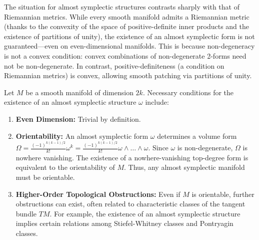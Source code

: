 The situation for almost symplectic structures contrasts sharply with that of Riemannian metrics. While every smooth manifold admits a Riemannian metric (thanks to the convexity of the space of positive-definite inner products and the existence of partitions of unity), the existence of an almost symplectic form is not guaranteed—even on even-dimensional manifolds. This is because non-degeneracy is not a convex condition: convex combinations of non-degenerate 2-forms need not be non-degenerate. In contrast, positive-definiteness (a condition on Riemannian metrics) is convex, allowing smooth patching via partitions of unity.

\begin{proposition}
Let $M$ be a smooth manifold of dimension $2k$. Necessary conditions for the existence of an almost symplectic structure $\omega$ include:
\begin{enumerate}
    \item \textbf{Even Dimension:} Trivial by definition.
    \item \textbf{Orientability:} An almost symplectic form $\omega$ determines a volume form $\Omega = \frac{(-1)^{k(k-1)/2}}{k!} \omega^k = \frac{(-1)^{k(k-1)/2}}{k!} \omega \wedge \dots \wedge \omega$. Since $\omega$ is non-degenerate, $\Omega$ is nowhere vanishing. The existence of a nowhere-vanishing top-degree form is equivalent to the orientability of $M$. Thus, any almost symplectic manifold must be orientable.
    \item \textbf{Higher-Order Topological Obstructions:} Even if $M$ is orientable, further obstructions can exist, often related to characteristic classes of the tangent bundle $TM$. For example, the existence of an almost symplectic structure implies certain relations among Stiefel-Whitney classes and Pontryagin classes.
\end{enumerate}
\end{proposition}

